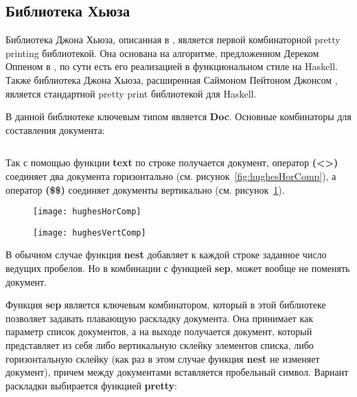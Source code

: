 \subsection{Библиотека Хьюза}

Библиотека Джона Хьюза, описанная в \cite{hughes}, является первой комбинаторной pretty printing библиотекой. Она основана на алгоритме, предложенном Дереком Оппеном в \cite{oppen}, по сути есть его реализацией в функциональном стиле на Haskell. Также библиотека Джона Хьюза, расширенная Саймоном Пейтоном Джонсом \cite{peytonJones}, является стандартной pretty print библиотекой для Haskell.


В данной библиотеке ключевым типом является \textbf{Doc}. Основные комбинаторы для составления документа:
\inputminted{haskell}{codes/hughesBasicOperators.hs}

Так с помощью функции \textbf{text} по строке получается документ, оператор \textbf{(<>)} соединяет два документа горизонтально (см. рисунок~\ref{fig:hughesHorComp}), а оператор \textbf{(\$\$)} соединяет документы вертикально (см. рисунок~\ref{fig:hughesVertComp}).

\begin{figure}[h!]
	\begin{minipage}[b]{0.45\linewidth}
		\centering
		\texttt{[image: hughesHorComp]}
		\caption{}
		\label{fig:hughesHorComp}
	\end{minipage}
	\hspace{0.5cm}
	\begin{minipage}[b]{0.45\linewidth}
		\centering
		\texttt{[image: hughesVertComp]}
		\caption{}
		\label{fig:hughesVertComp}
	\end{minipage}
\end{figure}

В обычном случае функция \textbf{nest} добавляет к каждой строке заданное число ведущих пробелов. Но в комбинации с функцией \textbf{sep}, может вообще не поменять документ.

Функция \textbf{sep} является ключевым комбинатором, который в этой библиотеке позволяет задавать плавающую раскладку документа. Она принимает как параметр список документов, а на выходе получается документ, который представляет из себя либо вертикальную склейку элементов списка, либо горизонтальную склейку (как раз в этом случае функция \textbf{nest} не изменяет документ), причем между документами вставляется пробельный символ. Вариант раскладки выбирается функцией \textbf{pretty}:


